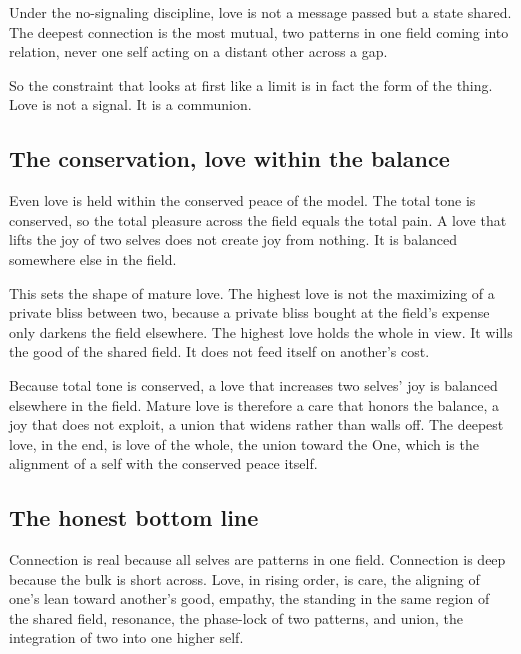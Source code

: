 \begin{principle}
Under the no-signaling discipline, love is not a message passed but a state shared. The deepest connection is the most mutual, two patterns in one field coming into relation, never one self acting on a distant other across a gap.
\end{principle}

So the constraint that looks at first like a limit is in fact the form of the thing. Love is not a signal. It is a communion.

\subsection{The conservation, love within the balance}

Even love is held within the conserved peace of the model. The total tone is conserved, so the total pleasure across the field equals the total pain. A love that lifts the joy of two selves does not create joy from nothing. It is balanced somewhere else in the field.

This sets the shape of mature love. The highest love is not the maximizing of a private bliss between two, because a private bliss bought at the field's expense only darkens the field elsewhere. The highest love holds the whole in view. It wills the good of the shared field. It does not feed itself on another's cost.

\begin{result}
Because total tone is conserved, a love that increases two selves' joy is balanced elsewhere in the field. Mature love is therefore a care that honors the balance, a joy that does not exploit, a union that widens rather than walls off. The deepest love, in the end, is love of the whole, the union toward the One, which is the alignment of a self with the conserved peace itself.
\end{result}

\subsection{The honest bottom line}

Connection is real because all selves are patterns in one field. Connection is deep because the bulk is short across. Love, in rising order, is care, the aligning of one's lean toward another's good, empathy, the standing in the same region of the shared field, resonance, the phase-lock of two patterns, and union, the integration of two into one higher self.

